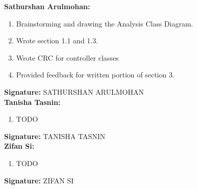 \documentclass[]{article}
\begin{document}
\textbf{Sathurshan Arulmohan:}
\begin{enumerate}
	\item Brainstorming and drawing the Analysis Class Diagram.
	\item Wrote section 1.1 and 1.3.
	\item Wrote CRC for controller classes
	\item Provided feedback for written portion of section 3.
\end{enumerate}

\textbf{Signature:} SATHURSHAN ARULMOHAN \\

\textbf{Tanisha Tasnin:}
\begin{enumerate}
	\item TODO
\end{enumerate}

\textbf{Signature:} TANISHA TASNIN \\

\textbf{Zifan Si:}
\begin{enumerate}
	\item TODO
\end{enumerate}

\textbf{Signature:} ZIFAN SI  \\
\end{document}
